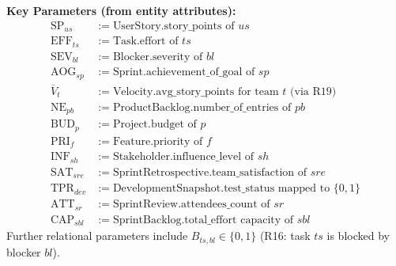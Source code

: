 \documentclass[11pt]{article}
\begin{document}
\noindent\textbf{Key Parameters (from entity attributes):}
\begin{align*}
\text{SP}_{us} &:= \text{UserStory.story\_points of $us$} \\
\text{EFF}_{ts} &:= \text{Task.effort of $ts$}\\
\text{SEV}_{bl} &:= \text{Blocker.severity of $bl$}\\
\text{AOG}_{sp} &:= \text{Sprint.achievement\_of\_goal of $sp$} \\
\overline{V}_{t} &:= \text{Velocity.avg\_story\_points for team $t$ (via R19)}\\
\text{NE}_{pb} &:= \text{ProductBacklog.number\_of\_entries of $pb$}\\
\text{BUD}_{p} &:= \text{Project.budget of $p$}\\
\text{PRI}_{f} &:= \text{Feature.priority of $f$}\\
\text{INF}_{sh} &:= \text{Stakeholder.influence\_level of $sh$}\\
\text{SAT}_{sre} &:= \text{SprintRetrospective.team\_satisfaction of $sre$}\\
\text{TPR}_{dev} &:= \text{DevelopmentSnapshot.test\_status mapped to } \{0,1\} \\
\text{ATT}_{sr} &:= \text{SprintReview.attendees\_count of $sr$}\\
\text{CAP}_{sbl} &:= \text{SprintBacklog.total\_effort capacity of $sbl$}
\end{align*}
Further relational parameters include $B_{ts,bl}\in\{0,1\}$ (R16: task $ts$ is blocked by blocker $bl$).
\end{document}
